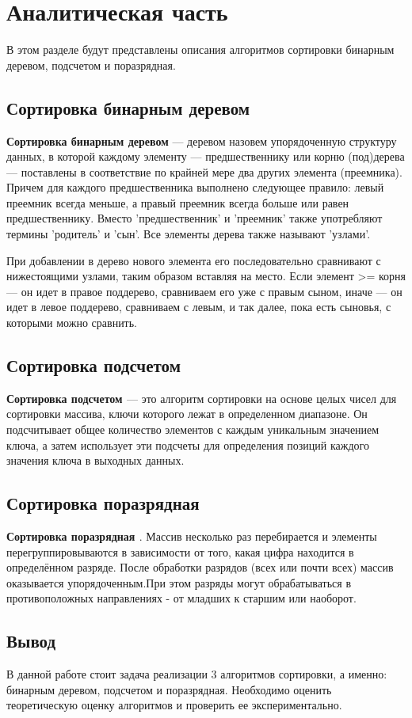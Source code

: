 \chapter{Аналитическая часть}

В этом разделе будут представлены описания алгоритмов сортировки бинарным деревом, подсчетом и поразрядная.


\section{Сортировка бинарным деревом}

\textbf{Сортировка бинарным деревом} \cite{binary} --- деревом назовем упорядоченную структуру данных, в которой каждому элементу --- предшественнику или корню (под)дерева --- поставлены в соответствие по крайней мере два других элемента (преемника). 
Причем для каждого предшественника выполнено следующее правило: левый преемник всегда меньше, а правый преемник всегда больше или равен предшественнику.  
Вместо 'предшественник' и 'преемник' также употребляют термины 'родитель' и 'сын'. Все элементы дерева также называют 'узлами'.

При добавлении в дерево нового элемента его последовательно сравнивают с нижестоящими узлами, таким образом вставляя на место.
Если элемент >= корня --- он идет в правое поддерево, сравниваем его уже с правым сыном, иначе --- он идет в левое поддерево, сравниваем с левым, и так далее, пока есть сыновья, с которыми можно сравнить.


\section{Сортировка подсчетом}

\textbf{Сортировка подсчетом \cite{counting_sort}} --- это алгоритм сортировки на основе целых чисел для сортировки массива, ключи которого лежат в определенном диапазоне. Он подсчитывает общее количество элементов с каждым уникальным значением ключа, а затем использует эти подсчеты для определения позиций каждого значения ключа в выходных данных.

\section{Сортировка поразрядная}

\textbf{Сортировка поразрядная \cite{radix_sort}}. Массив несколько раз перебирается и элементы перегруппировываются в зависимости от того, какая цифра находится в определённом разряде. После обработки разрядов (всех или почти всех) массив оказывается упорядоченным.При этом разряды могут обрабатываться в противоположных направлениях - от младших к старшим или наоборот.



\section*{Вывод}

В данной работе стоит задача реализации 3 алгоритмов сортировки, а
именно: бинарным деревом, подсчетом и поразрядная. Необходимо оценить теоретическую оценку алгоритмов и проверить ее экспериментально.
